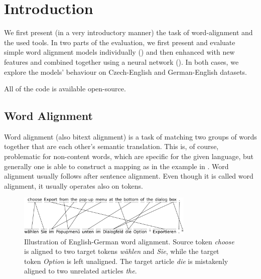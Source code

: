 \section{Introduction}

We first present (in a very introductory manner) the task of word-alignment and the used tools. In two parts of the evaluation, we first present and evaluate simple word alignment models individually () and then enhanced with new features and combined together using a neural network (). In both cases, we explore the models' behaviour on Czech-English and German-English datasets.

All of the code is available open-source.

\subsection{Word Alignment}

Word alignment (also bitext alignment) is a task of matching two groups of words together that are each other's semantic translation. This is, of course, problematic for non-content words, which are specific for the given language, but generally one is able to construct a mapping as in the example in . Word alignment usually follows after sentence alignment.  Even though it is called word alignment, it usually operates also on tokens.

\begin{figure}[h!]
    \center
    \includegraphics[width=0.75\textwidth]{img/alignment_example.pdf}
    \caption{
        Illustration of English-German word alignment. Source token \textit{choose} is aligned to two target tokens \textit{wählen} and \textit{Sie}, while the target token \textit{Option} is left unaligned. The target article \textit{die} is mistakenly aligned to two unrelated articles \textit{the}.
        \label{fig:alignment_example}
    }
\end{figure}

